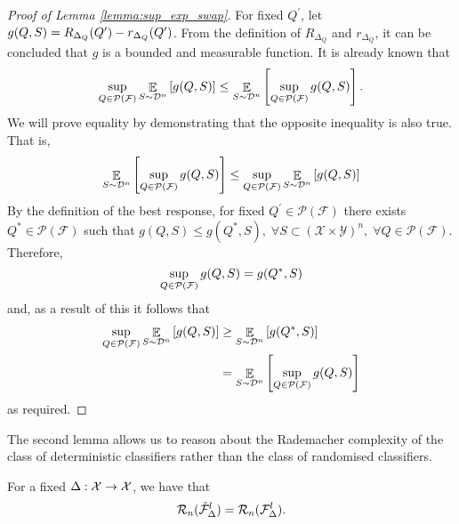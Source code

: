 \begin{proof}[Proof of Lemma \ref{lemma:sup_exp_swap}]
   For fixed $Q^\prime$, let $g(Q,S) = R_{\Delta_{Q}}(Q^\prime) - r_{\Delta_{Q}}(Q^\prime)$. From the definition of $R_{\Delta_{Q}}$ and $r_{\Delta_{Q}}$, it can be concluded that $g$ is a bounded and measurable function.
   It is already known that
   \begin{equation}
    \sup_{Q \in {\mathcal{P}}({\mathcal{F}})} \mathop{\mathbb{E}}_{S \sim \mathcal{D}^{n}} \left[ g(Q,S) \right] \leq \mathop{\mathbb{E}}_{S \sim \mathcal{D}^{n}} \left[ \sup_{Q \in {\mathcal{P}}({\mathcal{F}})} g(Q,S) \right].
    \end{equation}
    We will prove equality by demonstrating that the opposite inequality is also true. That is,
   \begin{equation}
       \mathop{\mathbb{E}}_{S \sim \mathcal{D}^{n}} \left[ \sup_{Q \in {\mathcal{P}}({\mathcal{F}})} g(Q,S) \right] \leq \sup_{Q \in {\mathcal{P}}({\mathcal{F}})} \mathop{\mathbb{E}}_{S \sim \mathcal{D}^{n}} \left[ g(Q,S) \right]
   \end{equation}
   By the definition of the best response, for fixed $Q^\prime \in \mathcal{P}(\mathcal{F})$ there exists $Q^{\ast} \in \mathcal{P}(\mathcal{F})$ such that $g(Q,S) \leq g(Q^{\ast},S), \; \forall S \subset (\mathcal{X} \times \mathcal{Y})^n, \;\forall Q \in \mathcal{P}(\mathcal{F})$. Therefore,
   \begin{equation}
       \sup_{Q \in {\mathcal{P}}({\mathcal{F}})} g(Q,S) = g(Q^{\ast},S) 
   \end{equation}
   and, as a result of this it follows that
   \begin{equation}
       \begin{split}
       \sup_{Q \in {\mathcal{P}}({\mathcal{F}})} \mathop{\mathbb{E}}_{S \sim \mathcal{D}^{n}} \left[ g(Q,S) \right] &\geq \mathop{\mathbb{E}}_{S \sim \mathcal{D}^{n}} \left[ g(Q^{\ast},S) \right] \\
       &= \mathop{\mathbb{E}}_{S \sim \mathcal{D}^{n}} \left[ \sup_{Q \in {\mathcal{P}}({\mathcal{F}})} g(Q,S) \right]
       \end{split}
   \end{equation}
   as required.
\end{proof}

 The second lemma allows us to reason about the Rademacher complexity of the class of deterministic classifiers rather than the class of randomised classifiers.

\begin{lemma}
    For a fixed $\Delta : {\mathcal{X}} \to {\mathcal{X}}$, we have that
    \begin{equation*}
        {\mathcal{R}}_n(\tilde{{\mathcal{F}}}^l_\Delta) = {\mathcal{R}}_n({\mathcal{F}}^l_\Delta).
    \end{equation*}
    \label{lemma:convex_hull_complexity_bound}
\end{lemma}

